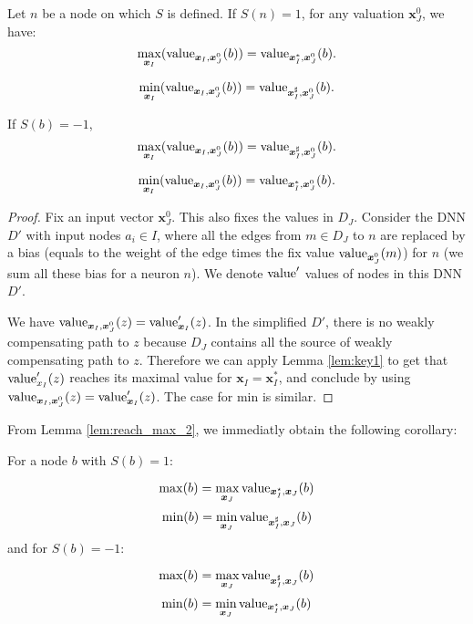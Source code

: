 			
			
			\begin{lemma} \label{lem:reach_max_2}
				Let $n$ be a node on which $S$ is defined. If $S(n)=1$,
				for any valuation $\boldsymbol{x}^0_J$,	we have: 
				$$\max_{\boldsymbol{x}_I} ({\textrm{value}}_{\boldsymbol{x}_I,\boldsymbol{x}^0_J}(b)) =  {\textrm{value}}_{\boldsymbol{x}_I^*,\boldsymbol{x}^0_J}(b).$$
				
				$$\min_{\boldsymbol{x}_I} ({\textrm{value}}_{\boldsymbol{x}_I,\boldsymbol{x}^0_J}(b)) =  {\textrm{value}}_{\boldsymbol{x}_I^{\sharp},\boldsymbol{x}^0_J}(b).$$
				
				
				If $S(b)=-1$, 
				$$\max_{\boldsymbol{x}_I} ({\textrm{value}}_{\boldsymbol{x}_I,\boldsymbol{x}^0_J}(b)) =  {\textrm{value}}_{\boldsymbol{x}_I^{\sharp},\boldsymbol{x}^0_J}(b).$$
				
				$$\min_{\boldsymbol{x}_I} ({\textrm{value}}_{\boldsymbol{x}_I,\boldsymbol{x}^0_J}(b)) =  {\textrm{value}}_{\boldsymbol{x}_I^{*},\boldsymbol{x}^0_J}(b).$$	
			\end{lemma}
			
			\begin{proof}	
				Fix an input vector $\boldsymbol{x}^0_J$.
				This also fixes the values in $D_J$.
				Consider the DNN $D'$ with input nodes $a_i\in I$, where all the 
				edges from $m \in D_J$ to $n$ are replaced by a bias (equals to the weight of the edge times the fix value ${\textrm{value}}_{\boldsymbol{x}^0_J}(m)$) for $n$ (we sum all these bias for a neuron $n$).
				We denote ${\textrm{value}}'$ values of nodes in this DNN $D'$.
				 
				We have ${\textrm{value}}_{\boldsymbol{x}_I,\boldsymbol{x}^0_J}(z) = {\textrm{value}}'_{\boldsymbol{x}_I}(z)$.
				In the simplified $D'$, there is no weakly compensating path to $z$ because 
				$D_J$ contains all the source of weakly compensating path to $z$.
				Therefore we can apply Lemma \ref{lem:key1} to get that 
				${\textrm{value}}'_{x_I}(z)$ reaches its maximal value for $\boldsymbol{x}_I=\boldsymbol{x}_I^*$, and conclude by using ${\textrm{value}}_{\boldsymbol{x}_I,\boldsymbol{x}^0_J}(z) = {\textrm{value}}'_{\boldsymbol{x}_I}(z)$. The case for min is similar. 
			\end{proof}
			
			From Lemma \ref{lem:reach_max_2}, we immediatly obtain the following corollary:

			\begin{corollary}
				\label{corr:main}
			For a node $b$ with $S(b)=1$:
		
			$$\max(b)=\max_{\boldsymbol{x}_J} {\textrm{value}}_{\boldsymbol{x}^{\star}_I,\boldsymbol{x}_J}(b)$$
			$$\min(b)=\min_{\boldsymbol{x}_J} {\textrm{value}}_{\boldsymbol{x}^{\sharp}_I,\boldsymbol{x}_J}(b)$$
			and for $S(b)=-1$:
	
			$$\max(b)=\max_{\boldsymbol{x}_J} {\textrm{value}}_{\boldsymbol{x}^{\sharp}_I,\boldsymbol{x}_J}(b)$$
			$$\min(b)=\min_{\boldsymbol{x}_J} {\textrm{value}}_{\boldsymbol{x}^{\star}_I,\boldsymbol{x}_J}(b)$$
			\end{corollary}
			
